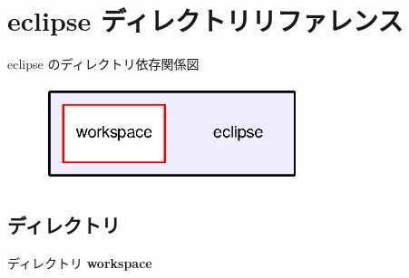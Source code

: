 \section{eclipse ディレクトリリファレンス}
\label{dir_89db577aa88594a56b7cb95279b1a768}
eclipse のディレクトリ依存関係図\nopagebreak
\begin{figure}[H]
\begin{center}
\leavevmode
\includegraphics[width=212pt]{dir_89db577aa88594a56b7cb95279b1a768_dep}
\end{center}
\end{figure}
\subsection*{ディレクトリ}
\begin{DoxyCompactItemize}
\item 
ディレクトリ {\bf workspace}
\end{DoxyCompactItemize}
